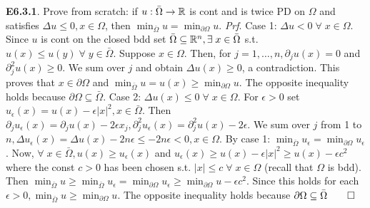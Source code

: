 {\bf E6.3.1}. Prove from scratch:  if $u: \bar{\Omega} \rightarrow \mathbb{R}$ is cont and is twice PD on $\Omega$ and satisfies $\Delta u \leq 0, x \in \Omega$, then $\min_{\bar{\Omega}} u = \min_{\partial \Omega} u$. {\it Prf}. Case 1: $\Delta u < 0\; \forall \;  x \in \Omega$. Since $u$ is cont on the closed bdd set $\bar{\Omega} \subseteq \mathbb{R}^n, \exists \; x \in \bar{\Omega}$ s.t. $u(x) \leq u(y)\; \forall \; y \in \bar{\Omega}$. Suppose $x \in \Omega$. Then, for $j = 1, \dots, n, \partial_j u(x) = 0$ and $\partial_j^2 u(x) \geq 0$. We sum over $j$ and obtain $\Delta u(x) \geq 0$, a contradiction.  This proves that $x \in \partial \Omega$ and $\min_{\bar{\Omega}} u = u(x) \geq \min_{\partial \Omega} u$. The opposite inequality holds because $\partial \Omega \subseteq \bar{\Omega}$. Case 2: $\Delta u(x) \leq 0 \; \forall \; x \in \Omega$. For $\epsilon >0$ set $u_{\epsilon}(x) = u(x) - \epsilon |x|^2, x \in \bar{\Omega}$. Then $\partial_j u_{\epsilon}(x) = \partial_j u(x) - 2 \epsilon x_j, \partial_j^2 u_{\epsilon}(x) = \partial_j^2 u(x) - 2 \epsilon$.  We sum over $j$ from 1 to $n, \Delta u_{\epsilon}(x) = \Delta u (x) - 2 n \epsilon \leq -2 n \epsilon < 0, x \in \Omega$. By case 1: $\min_{\bar{\Omega}} u_{\epsilon} = \min_{\partial \Omega} u_{\epsilon}$. Now, $\forall \;x \in \bar{\Omega}, u(x) \geq u_{\epsilon}(x)$ and $u_{\epsilon}(x)\geq u(x) - \epsilon |x|^2 \geq u(x) - \epsilon c^2$ where the const $c > 0$ has been chosen s.t. $|x| \leq c \; \forall \; x \in \Omega$ (recall that $\Omega$ is bdd).  Then $\min_{\bar{\Omega}} u \geq \min_{\bar{\Omega}} u_{\epsilon} = \min_{\partial \Omega} u_{\epsilon} \geq \min_{\partial \Omega} u - \epsilon c^2$.  Since this holds for each $\epsilon > 0, \min_{\bar{\Omega}} u \geq  \min_{\partial \Omega} u$. The opposite inequality holds because $\partial \Omega \subseteq \bar{\Omega} \qed$
